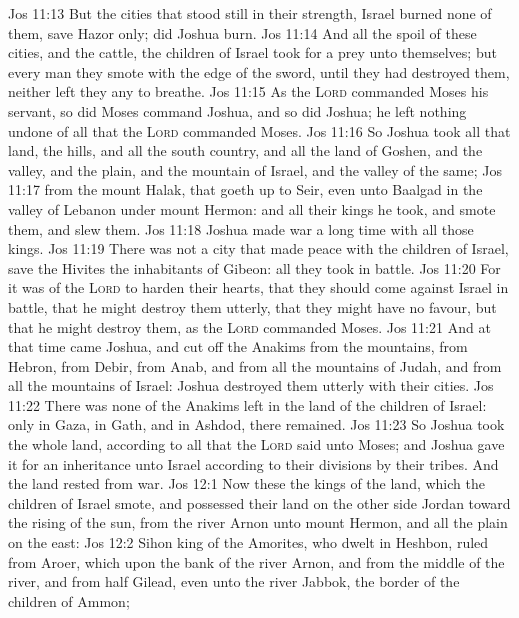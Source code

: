 \vs Jos 11:13 But  the cities that stood still in their strength, Israel burned none of them, save Hazor only;  did Joshua burn.
\vs Jos 11:14 And all the spoil of these cities, and the cattle, the children of Israel took for a prey unto themselves; but every man they smote with the edge of the sword, until they had destroyed them, neither left they any to breathe.
\vs Jos 11:15 As the \textsc{Lord} commanded Moses his servant, so did Moses command Joshua, and so did Joshua; he left nothing undone of all that the \textsc{Lord} commanded Moses.
\vs Jos 11:16 So Joshua took all that land, the hills, and all the south country, and all the land of Goshen, and the valley, and the plain, and the mountain of Israel, and the valley of the same;
\vs Jos 11:17  from the mount Halak, that goeth up to Seir, even unto Baalgad in the valley of Lebanon under mount Hermon: and all their kings he took, and smote them, and slew them.
\vs Jos 11:18 Joshua made war a long time with all those kings.
\vs Jos 11:19 There was not a city that made peace with the children of Israel, save the Hivites the inhabitants of Gibeon: all  they took in battle.
\vs Jos 11:20 For it was of the \textsc{Lord} to harden their hearts, that they should come against Israel in battle, that he might destroy them utterly,  that they might have no favour, but that he might destroy them, as the \textsc{Lord} commanded Moses.
\vs Jos 11:21 And at that time came Joshua, and cut off the Anakims from the mountains, from Hebron, from Debir, from Anab, and from all the mountains of Judah, and from all the mountains of Israel: Joshua destroyed them utterly with their cities.
\vs Jos 11:22 There was none of the Anakims left in the land of the children of Israel: only in Gaza, in Gath, and in Ashdod, there remained.
\vs Jos 11:23 So Joshua took the whole land, according to all that the \textsc{Lord} said unto Moses; and Joshua gave it for an inheritance unto Israel according to their divisions by their tribes. And the land rested from war.
\vs Jos 12:1 Now these  the kings of the land, which the children of Israel smote, and possessed their land on the other side Jordan toward the rising of the sun, from the river Arnon unto mount Hermon, and all the plain on the east:
\vs Jos 12:2 Sihon king of the Amorites, who dwelt in Heshbon,  ruled from Aroer, which  upon the bank of the river Arnon, and from the middle of the river, and from half Gilead, even unto the river Jabbok,  the border of the children of Ammon;
